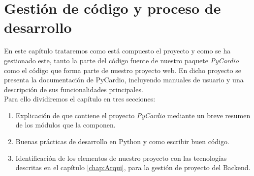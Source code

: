 \chapter{Gestión de código y proceso de desarrollo}
\label{chap:codeManagement}

En este capítulo trataremos como está compuesto el proyecto y como se ha gestionado este, tanto la parte del código fuente de nuestro paquete \emph{PyCardio} como el código que forma parte de nuestro proyecto web. En dicho proyecto se presenta la documentación de PyCardio, incluyendo manuales de usuario y una descripción de sus funcionalidades principales. \\
Para ello dividiremos el capítulo en tres secciones:
\begin{enumerate}
    \item Explicación de que contiene el proyecto \emph{PyCardio} mediante un breve resumen de los módulos que la componen. 
    \item Buenas prácticas de desarrollo en Python y como escribir buen código.
    \item Identificación de los elementos de nuestro proyecto con las tecnologías descritas en el capítulo \ref{chap:Arqui}, para la gestión de proyecto del Backend.
\end{enumerate}

